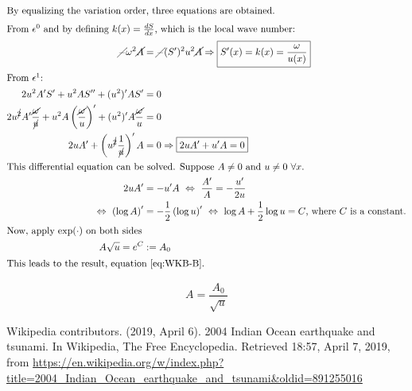 \documentclass[a4paper,12pt,twoside]{article}
\newcommand{\bracket}[1]{\left(#1\right)}
\begin{document}
\begin{align*}
        \intertext{By  equalizing the variation order, three equations are obtained.}
        \intertext{From $\epsilon^0$ and by defining $k(x) = \frac{dS}{dx}$, which is the local wave number:}
        \cancel{-}\omega^2\cancel{A} &= \cancel{-}(S')^2u^2\cancel{A} \Rightarrow \boxed{S'(x)=k(x)=\frac{\omega}{u(x)}}\\
        \intertext{From $\epsilon^1$:}
        2u^2A'S'+u^2AS''+(u^2)'AS' &= 0\\
        2u^{\cancel{2}}A'\frac{\cancel{\omega}}{\cancel{u}}+u^2A\bracket{\frac{\cancel{\omega}}{u}}'+(u^2)'A\frac{\cancel{\omega}}{u} &= 0\\
        2uA' + \bracket{u^{\cancel{2}}\frac{1}{\cancel{u}}}'A &= 0 \Rightarrow \boxed{2uA' + u'A = 0}\\
        \intertext{This differential equation can be solved. Suppose $A\neq0$ and $u\neq0~\forall x$.}
        2uA' &= - u'A~\Leftrightarrow~\frac{A'}{A} = -\frac{u'}{2u}\\
        \Leftrightarrow~\bracket{\log A}' &= -\frac{1}{2}\bracket{\log u}'~\Leftrightarrow~\log A+\frac{1}{2}\log u = C\text{, where $C$ is a constant.}\\
        \intertext{Now, apply $\exp(\cdot)$ on both sides}
        A\sqrt{u} = e^C &:= A_0\\
        \intertext{This leads to the result, equation \eqref{eq:WKB-B}.}
      \end{align*}

      \begin{equation}
        \boxed{A=\frac{A_0}{\sqrt{u}}}
        \label{eq:WKB-B}
      \end{equation}






  \newpage
  \begin{thebibliography}{99}
     Wikipedia contributors. (2019, April 6). 2004 Indian Ocean earthquake and tsunami. In Wikipedia, The Free Encyclopedia. Retrieved 18:57, April 7, 2019, from \url{https://en.wikipedia.org/w/index.php?title=2004_Indian_Ocean_earthquake_and_tsunami&oldid=891255016}


  \end{thebibliography}
\end{document}
